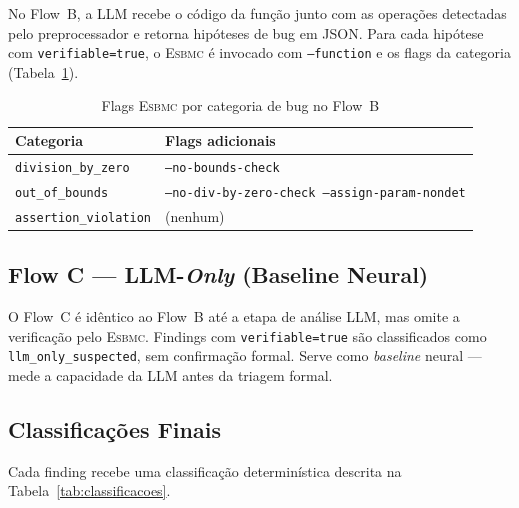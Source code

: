 \documentclass[conference]{IEEEtran}
\newcommand{\esbmc}{\textsc{Esbmc}}
\newcommand{\flowB}{Flow~B}
\newcommand{\flowC}{Flow~C}
\begin{document}
No \flowB{}, a LLM recebe o código da função junto com as operações
detectadas pelo preprocessador e retorna hipóteses de bug em JSON.
Para cada hipótese com \texttt{verifiable=true}, o \esbmc{} é invocado
com \texttt{--function} e os flags da categoria (Tabela~\ref{tab:flags}).

\begin{table}[htbp]
  \caption{Flags \esbmc{} por categoria de bug no \flowB{}}
  \label{tab:flags}
  \begin{center}
    \begin{tabular}{ll}
      \toprule
      \textbf{Categoria} & \textbf{Flags adicionais} \\
      \midrule
      \texttt{division\_by\_zero}    & \texttt{--no-bounds-check} \\
      \texttt{out\_of\_bounds}       & \texttt{--no-div-by-zero-check --assign-param-nondet} \\
      \texttt{assertion\_violation}  & (nenhum) \\
      \bottomrule
    \end{tabular}
  \end{center}
\end{table}

\subsection{Flow C — LLM-\textit{Only} (Baseline Neural)}

O \flowC{} é idêntico ao \flowB{} até a etapa de análise LLM, mas omite
a verificação pelo \esbmc{}.
Findings com \texttt{verifiable=true} são classificados como
\texttt{llm\_only\_suspected}, sem confirmação formal.
Serve como \textit{baseline} neural — mede a capacidade da LLM antes
da triagem formal.

\subsection{Classificações Finais}

Cada finding recebe uma classificação determinística descrita na
Tabela~\ref{tab:classificacoes}.
\end{document}

